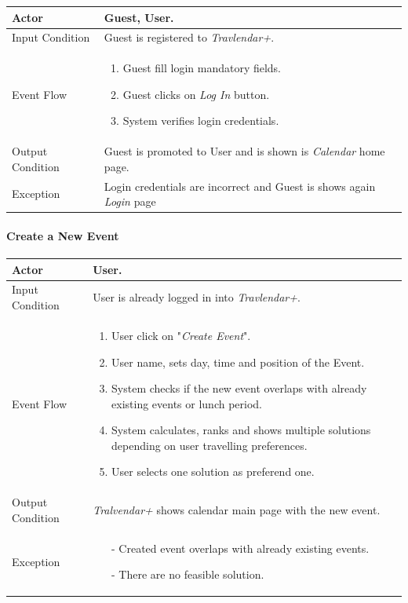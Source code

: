 		\begin{tabular}{| l | p{} | }
			\hline
			\hline
			Actor	&		Guest, User. \\
			\hline
			Input Condition		&		Guest is registered to  \textit{Travlendar+}. \\
			\hline
			Event Flow		&		\begin{enumerate}
												\item Guest fill login mandatory fields.
												\item Guest clicks on \textit{Log In} button.
												\item System verifies login credentials.
											\end{enumerate} \\
			\hline
			Output Condition		&		Guest is promoted to User and is shown is \textit{Calendar} home page. \\
			\hline		
			Exception		&		Login credentials are incorrect and Guest is shows again \textit{Login} page\\
			\hline
			\hline
		\end{tabular}

	\paragraph{Create a New Event}
	
		\begin{tabular}{| l | p{} | }
			\hline
			\hline
			Actor	&		User. \\
			\hline
			Input Condition		&		User is already logged in into \textit{Travlendar+}. \\
			\hline
			Event Flow		&		\begin{enumerate}
												\item User click on "\textit{Create Event}".
												\item User name, sets day, time and position of the Event.
												\item System checks if the new event overlaps with already existing events or lunch period.
												\item	 System calculates, ranks and shows multiple solutions depending on user travelling preferences.
												\item User selects one solution as preferend one.
											\end{enumerate} \\
			\hline
			Output Condition		&		\textit{Tralvendar+} shows calendar main page with the new event. \\
			\hline		
			Exception		&		\begin{itemize}
											\item[-] Created event overlaps with already existing events.
											\item[-] There are no feasible solution.
										\end{itemize} \\
			\hline
			\hline
		\end{tabular}


